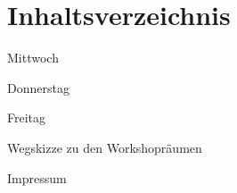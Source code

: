 \section*{Inhaltsverzeichnis}


\vspace*{0.35em}%
\noindent Mittwoch \dotfill \pageref{mittwoch}

\vspace*{0.35em}%
\noindent Donnerstag \dotfill \pageref{donnerstag}

\vspace*{0.35em}%
\noindent Freitag \dotfill \pageref{freitag}

\vspace*{0.35em}%
\noindent Wegskizze zu den Workshopräumen \dotfill \pageref{karte}

\vspace*{0.35em}%
\noindent Impressum \dotfill \pageref{impressum}\\

\newpage

\newpage